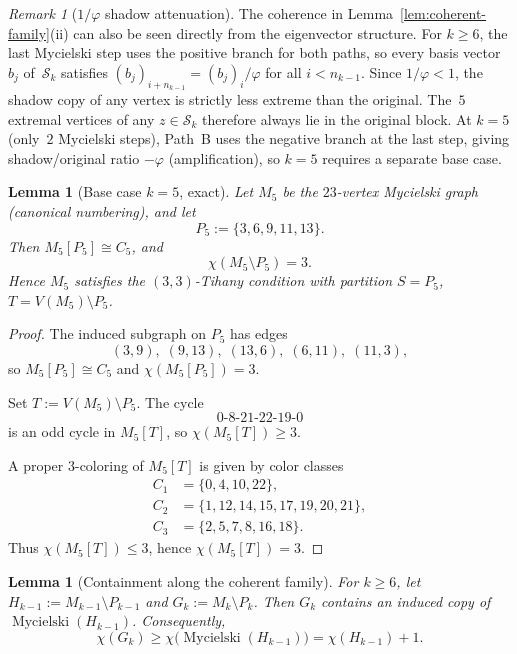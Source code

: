 \documentclass[11pt,a4paper]{amsart}
\theoremstyle{plain}
\newtheorem{lemma}[theorem]{Lemma}
\theoremstyle{definition}
\theoremstyle{remark}
\newtheorem{remark}[theorem]{Remark}
\newcommand{\vp}{\varphi}
\newcommand{\myc}{\operatorname{Mycielski}}
\newcommand{\chr}{\chi}
\begin{document}
\begin{remark}[$1/\vp$ shadow attenuation]\label{rem:shadow-attenuation}
The coherence in Lemma~\ref{lem:coherent-family}(ii) can also be
seen directly from the eigenvector structure.  For $k \geq 6$, the last
Mycielski step uses the positive branch for both paths, so every basis vector
$b_j$ of~$\mathcal{S}_k$ satisfies
$(b_j)_{i+n_{k-1}} = (b_j)_i / \vp$ for all $i < n_{k-1}$.
Since $1/\vp < 1$, the shadow copy of any vertex is strictly less extreme
than the original.  The~$5$ extremal vertices of any $z \in \mathcal{S}_k$
therefore always lie in the original block.  At $k = 5$
(only~$2$ Mycielski steps), Path~B uses the negative branch at the last step,
giving shadow/original ratio $-\vp$ (amplification), so $k = 5$ requires
a separate base case.
\end{remark}

\begin{lemma}[Base case $k=5$, exact]\label{lem:base-k5}
Let $M_5$ be the $23$-vertex Mycielski graph (canonical numbering), and let
\[
P_5:=\{3,6,9,11,13\}.
\]
Then $M_5[P_5]\cong C_5$, and
\[
\chr(M_5\setminus P_5)=3.
\]
Hence $M_5$ satisfies the $(3,3)$-Tihany condition with partition
$S=P_5$, $T=V(M_5)\setminus P_5$.
\end{lemma}

\begin{proof}
The induced subgraph on $P_5$ has edges
\[
(3,9),\;(9,13),\;(13,6),\;(6,11),\;(11,3),
\]
so $M_5[P_5]\cong C_5$ and $\chr(M_5[P_5])=3$.

Set $T:=V(M_5)\setminus P_5$.  The cycle
\[
0\text{-}8\text{-}21\text{-}22\text{-}19\text{-}0
\]
is an odd cycle in $M_5[T]$, so $\chr(M_5[T])\ge 3$.

A proper $3$-coloring of $M_5[T]$ is given by color classes
\[
\begin{aligned}
C_1&=\{0,4,10,22\},\\
C_2&=\{1,12,14,15,17,19,20,21\},\\
C_3&=\{2,5,7,8,16,18\}.
\end{aligned}
\]
Thus $\chr(M_5[T])\le 3$, hence $\chr(M_5[T])=3$.
\end{proof}

\begin{lemma}[Containment along the coherent family]\label{lem:containment-coherent}
For $k\ge 6$, let $H_{k-1}:=M_{k-1}\setminus P_{k-1}$ and
$G_k:=M_k\setminus P_k$.  Then $G_k$ contains an induced copy of
$\myc(H_{k-1})$.  Consequently,
\[
\chr(G_k)\ge \chr\!\bigl(\myc(H_{k-1})\bigr)=\chr(H_{k-1})+1.
\]
\end{lemma}
\end{document}
